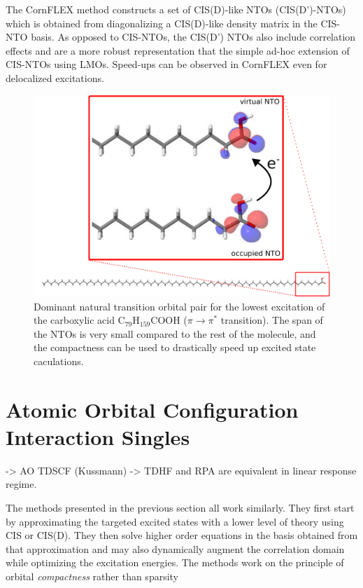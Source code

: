 The CornFLEX method constructs a set of CIS(D)-like NTOs (CIS(D')-NTOs) which is obtained from diagonalizing a CIS(D)-like density matrix in the CIS-NTO basis. As opposed to CIS-NTOs, the CIS(D') NTOs also include correlation effects and are a more robust representation that the simple ad-hoc extension of CIS-NTOs using LMOs. Speed-ups can be observed in CornFLEX even for delocalized excitations.


\begin{figure}
\centering
\includegraphics[scale=0.6]{Pics/NTOACID}
\caption{Dominant natural transition orbital pair for the lowest excitation of the carboxylic acid C$_{79}$H$_{159}$COOH ($\pi \rightarrow \pi^*$ transition). The span of the NTOs is very small compared to the rest of the molecule, and the compactness can be used to drastically speed up excited state caculations. }
\end{figure}

\section{Atomic Orbital Configuration Interaction Singles}

-> AO TDSCF (Kussmann)
-> TDHF and RPA are equivalent in linear response regime. %

The methods presented in the previous section all work similarly. They first start by approximating the targeted excited states with a lower level of theory using CIS or CIS(D). They then solve higher order equations in the basis obtained from that approximation and may also dynamically augment the correlation domain while optimizing the excitation energies. The methods work on the principle of orbital \emph{compactness} rather than sparsity


